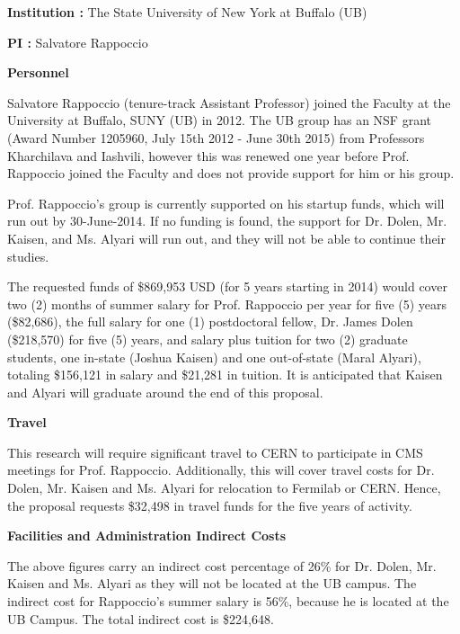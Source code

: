 \documentclass[12pt]{proposalnsf}
\begin{document}
\newpage
{}
\renewcommand{\thepage} {A--\arabic{page}}

{}


\newpage
{}
\renewcommand{\thepage} {B--\arabic{page}}

\bigskip
{\bf Institution : } The State University of New York at Buffalo (UB)

{\bf PI : } Salvatore Rappoccio


\bigskip
{\bf Personnel}
\bigskip

Salvatore Rappoccio (tenure-track Assistant Professor) joined the
Faculty at the University at Buffalo, SUNY (UB) in 2012. The UB group
has an
NSF grant (Award Number 1205960, July 15th 2012 - June 30th 2015) from
Professors Kharchilava and Iashvili, however this
was renewed one year before Prof. Rappoccio joined the Faculty and does not
provide support for him or his group. 

Prof. Rappoccio's group is currently supported on his startup funds,
which will run out by 30-June-2014. If no funding is found, the
support for Dr. Dolen, Mr. Kaisen, and Ms. Alyari will run out, and
they will not be able to continue their studies. 


\bigskip


The requested funds of \$869,953 USD (for 5 years starting in 2014)
would cover two (2) months of summer salary for Prof. Rappoccio per
year for five (5) years
(\$82,686), the full salary for 
one (1) postdoctoral fellow, Dr. James Dolen (\$218,570) for five (5)
years, and salary plus
tuition for two (2) graduate students, one in-state (Joshua
Kaisen) and one out-of-state (Maral Alyari), totaling \$156,121 in
salary and \$21,281 in tuition. 
It is anticipated that Kaisen and
Alyari will graduate around the end of this proposal.


\bigskip
{\bf Travel}
\bigskip

This research will require significant travel to CERN to participate
in CMS meetings for Prof. Rappoccio. Additionally, this will cover
travel costs for Dr. Dolen, Mr. Kaisen and Ms. Alyari for relocation
to Fermilab or CERN. 
Hence, the proposal requests \$32,498 in travel funds for the five
years of activity. 

\bigskip
{\bf Facilities and Administration Indirect Costs}
\bigskip

The above figures carry an indirect cost
percentage of 26\% for Dr. Dolen, Mr. Kaisen and Ms. Alyari as they
will not be located at the UB campus. The indirect cost
for Rappoccio's summer salary is 56\%, because he is located at the
UB Campus. The total indirect cost is \$224,648.
\end{document}
